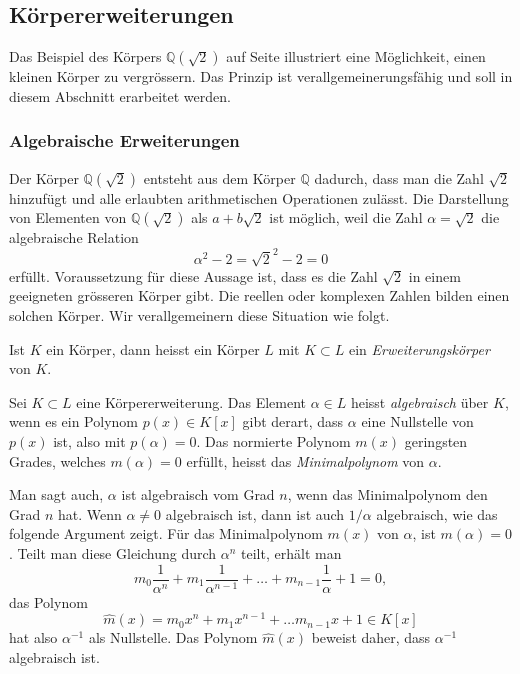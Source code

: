 %
%
%
\subsection{Körpererweiterungen
\label{buch:integral:subsection:koerpererweiterungen}}
Das Beispiel des Körpers $\mathbb{Q}(\!\sqrt{2})$ auf Seite
\pageref{buch:integral:beispiel:Qsqrt2} illustriert eine Möglichkeit,
einen kleinen Körper zu vergrössern.
Das Prinzip ist verallgemeinerungsfähig und soll in diesem Abschnitt
erarbeitet werden.

%
%
\subsubsection{Algebraische Erweiterungen}
Der Körper $\mathbb{Q}(\!\sqrt{2})$ entsteht aus dem Körper $\mathbb{Q}$
dadurch, dass man die Zahl $\sqrt{2}$ hinzufügt und alle erlaubten
arithmetischen Operationen zulässt.
Die Darstellung von Elementen von $\mathbb{Q}(\!\sqrt{2})$ als
$a+b\sqrt{2}$ ist möglich, weil die Zahl $\alpha=\sqrt{2}$ die 
algebraische Relation
\[
\alpha^2-2 = \sqrt{2}^2 -2 = 0
\]
erfüllt.
Voraussetzung für diese Aussage ist, dass es die Zahl $\sqrt{2}$ in einem
geeigneten grösseren Körper gibt. 
Die reellen oder komplexen Zahlen bilden einen solchen Körper.
Wir verallgemeinern diese Situation wie folgt.

\begin{definition}
Ist $K$ ein Körper, dann heisst ein Körper $L$ mit $K\subset L$ ein
{\em Erweiterungskörper} von $K$.
\end{definition}

\begin{definition}
\label{buch:integral:definition:algebraisch}
Sei $K\subset L$ eine Körpererweiterung.
Das Element $\alpha\in L$ heisst {\em algebraisch} über $K$, wenn es
ein Polynom $p(x)\in K[x]$ gibt derart, dass $\alpha$ eine Nullstelle
von $p(x)$ ist, also mit $p(\alpha)=0$.
Das normierte Polynom $m(x)$ geringsten Grades, welches $m(\alpha)=0$
erfüllt, heisst das {\em Minimalpolynom} von $\alpha$.
%
\end{definition}

Man sagt auch, $\alpha$ ist algebraisch vom Grad $n$, wenn das Minimalpolynom
den Grad $n$ hat.
Wenn $\alpha\ne 0$ algebraisch ist, dann ist auch $1/\alpha$ algebraisch,
wie das folgende Argument zeigt.
Für das Minimalpolynom $m(x)$ von $\alpha$, ist $m(\alpha)=0$.
Teilt man diese Gleichung durch $\alpha^n$ teilt, erhält man 
\[
m_0\frac{1}{\alpha^n}
+
m_1\frac{1}{\alpha^{n-1}}
+
\ldots
+
m_{n-1}\frac{1}{\alpha}
+
1
=
0,
\]
das Polynom
\[
\hat{m}(x)
=
m_0x^n + m_1x^{n-1} + \ldots m_{n-1} x + 1
\in
K[x]
\]
hat also $\alpha^{-1}$ als Nullstelle.
Das Polynom $\hat{m}(x)$ beweist daher, dass $\alpha^{-1}$ algebraisch ist.

